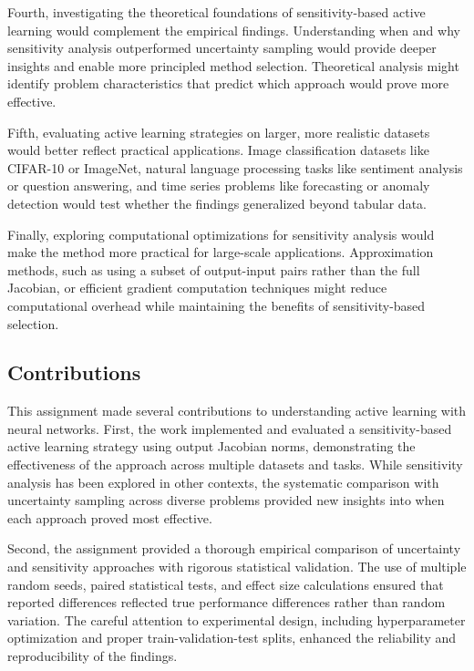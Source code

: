 \documentclass[conference]{IEEEtran}
\begin{document}
Fourth, investigating the theoretical foundations of sensitivity-based active learning would complement the empirical findings. Understanding when and why sensitivity analysis outperformed uncertainty sampling would provide deeper insights and enable more principled method selection. Theoretical analysis might identify problem characteristics that predict which approach would prove more effective.

Fifth, evaluating active learning strategies on larger, more realistic datasets would better reflect practical applications. Image classification datasets like CIFAR-10 or ImageNet, natural language processing tasks like sentiment analysis or question answering, and time series problems like forecasting or anomaly detection would test whether the findings generalized beyond tabular data.

Finally, exploring computational optimizations for sensitivity analysis would make the method more practical for large-scale applications. Approximation methods, such as using a subset of output-input pairs rather than the full Jacobian, or efficient gradient computation techniques might reduce computational overhead while maintaining the benefits of sensitivity-based selection.

\subsection{Contributions}

This assignment made several contributions to understanding active learning with neural networks. First, the work implemented and evaluated a sensitivity-based active learning strategy using output Jacobian norms, demonstrating the effectiveness of the approach across multiple datasets and tasks. While sensitivity analysis has been explored in other contexts, the systematic comparison with uncertainty sampling across diverse problems provided new insights into when each approach proved most effective.

Second, the assignment provided a thorough empirical comparison of uncertainty and sensitivity approaches with rigorous statistical validation. The use of multiple random seeds, paired statistical tests, and effect size calculations ensured that reported differences reflected true performance differences rather than random variation. The careful attention to experimental design, including hyperparameter optimization and proper train-validation-test splits, enhanced the reliability and reproducibility of the findings.
\end{document}
